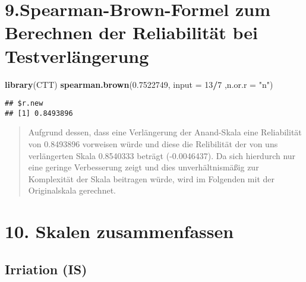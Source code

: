 \documentclass[
]{article}
\newenvironment{Shaded}{\begin{snugshade}}{\end{snugshade}}
\newcommand{\AttributeTok}[1]{\textcolor[rgb]{0.13,0.29,0.53}{#1}}
\newcommand{\DecValTok}[1]{\textcolor[rgb]{0.00,0.00,0.81}{#1}}
\newcommand{\FloatTok}[1]{\textcolor[rgb]{0.00,0.00,0.81}{#1}}
\newcommand{\FunctionTok}[1]{\textcolor[rgb]{0.13,0.29,0.53}{\textbf{#1}}}
\newcommand{\NormalTok}[1]{#1}
\newcommand{\OtherTok}[1]{\textcolor[rgb]{0.56,0.35,0.01}{#1}}
\newcommand{\SpecialCharTok}[1]{\textcolor[rgb]{0.81,0.36,0.00}{\textbf{#1}}}
\newcommand{\StringTok}[1]{\textcolor[rgb]{0.31,0.60,0.02}{#1}}
\begin{document}
\section{9.Spearman-Brown-Formel zum Berechnen der Reliabilität bei
Testverlängerung}\label{spearman-brown-formel-zum-berechnen-der-reliabilituxe4t-bei-testverluxe4ngerung}

\begin{Shaded}
\begin{Highlighting}[]
\FunctionTok{library}\NormalTok{(CTT)}
\FunctionTok{spearman.brown}\NormalTok{(}\FloatTok{0.7522749}\NormalTok{, }\AttributeTok{input =} \DecValTok{13}\SpecialCharTok{/}\DecValTok{7}\NormalTok{ ,}\AttributeTok{n.or.r =} \StringTok{"n"}\NormalTok{)}
\end{Highlighting}
\end{Shaded}

\begin{verbatim}
## $r.new
## [1] 0.8493896
\end{verbatim}

\begin{quote}
Aufgrund dessen, dass eine Verlängerung der Anand-Skala eine
Reliabilität von 0.8493896 vorweisen würde und diese die Relibilität der
von uns verlängerten Skala 0.8540333 beträgt (-0.0046437). Da sich
hierdurch nur eine geringe Verbesserung zeigt und dies unverhältnismäßig
zur Komplexität der Skala beitragen würde, wird im Folgenden mit der
Originalskala gerechnet.
\end{quote}

\section{10. Skalen zusammenfassen}\label{skalen-zusammenfassen}

\subsection{Irriation (IS)}\label{irriation-is}

\begin{Shaded}
\end{Shaded}
\end{document}
